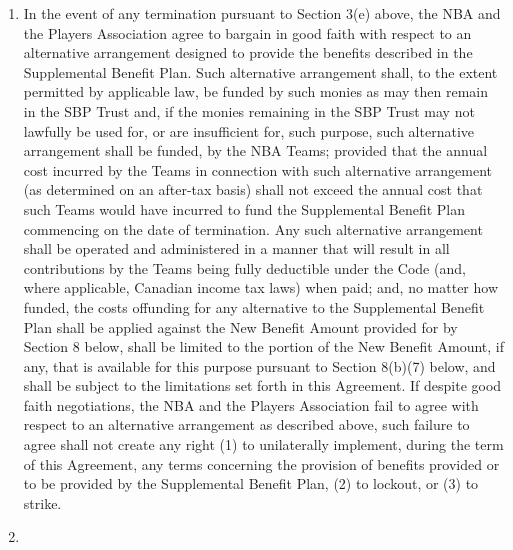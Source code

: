 \documentclass[
]{book}
\begin{document}
\begin{enumerate}
\item
  In the event of any termination pursuant to Section 3(e) above, the NBA and the Players Association agree to bargain in good faith with respect to an alternative arrangement designed to provide the benefits described in the Supplemental Benefit Plan. Such alternative arrangement shall, to the extent permitted by applicable law, be funded by such monies as may then remain in the SBP Trust and, if the monies remaining in the SBP Trust may not lawfully be used for, or are insufficient for, such purpose, such alternative arrangement shall be funded, by the NBA Teams; provided that the annual cost incurred by the Teams in connection with such alternative arrangement (as determined on an after-tax basis) shall not exceed the annual cost that such Teams would have incurred to fund the Supplemental Benefit Plan commencing on the date of termination. Any such alternative arrangement shall be operated and administered in a manner that will result in all contributions by the Teams being fully deductible under the Code (and, where applicable, Canadian income tax laws) when paid; and, no matter how funded, the costs offunding for any alternative to the Supplemental Benefit Plan shall be applied against the New Benefit Amount provided for by Section 8 below, shall be limited to the portion of the New Benefit Amount, if any, that is available for this purpose pursuant to Section 8(b)(7) below, and shall be subject to the limitations set forth in this Agreement. If despite good faith negotiations, the NBA and the Players Association fail to agree with respect to an alternative arrangement as described above, such failure to agree shall not create any right (1) to unilaterally implement, during the term of this Agreement, any terms concerning the provision of benefits provided or to be provided by the Supplemental Benefit Plan, (2) to lockout, or (3) to strike.
\item

\end{enumerate}
\end{document}
